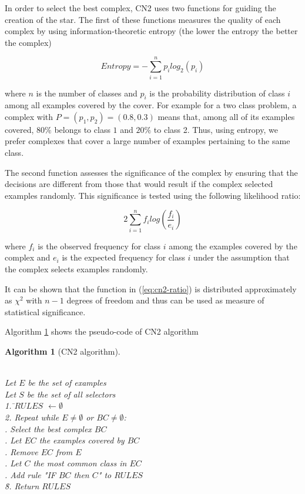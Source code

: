 \documentclass[preprint,3p,twocolumn]{elsarticle}
\newtheorem{algorithm}{Algorithm}[section]
\begin{document}
In order to select the best complex, CN2 uses two functions for guiding the creation of the star. The first of these functions measures the quality of each complex by using information-theoretic entropy (the lower the entropy the better the complex)

\begin{equation} \label{eqn:cn2-entropy}
Entropy = - \sum_{i=1}^{n} p_{i} log_{2}(p_{i})
\end{equation}


where $n$ is the number of classes and $p_{i}$ is the probability distribution of class $i$ among all examples covered by the cover. For example for a two class problem, a complex with $P = (p_{1}, p_{2}) = (0.8, 0.3)$ means that, among all of its examples covered, $80\%$ belongs to class $1$ and $20\%$ to class 2.
Thus, using entropy, we prefer complexes that cover a large number of examples pertaining to the same class.

The second function assesses the significance of the complex by ensuring that the decisions are different from those that would result if the complex selected examples randomly. This significance is tested using the following likelihood ratio:

\begin{equation} \label{eq:cn2-ratio}
2 \sum_{i=1}^{n} f_{i} log \left( \frac{f_{i}}{e_{i}} \right) 
\end{equation}

where $f_{i}$ is the observed frequency for class $i$ among the examples covered by the complex and $e_{i}$ is the expected frequency for class $i$ under the assumption that the complex selects examples randomly.

It can be shown that the function in (\ref{eq:cn2-ratio}) is distributed approximately as $\chi^2$ with $n-1$ degrees of freedom and thus can be used as measure of statistical significance.

Algorithm \ref{algo:CN2} shows the pseudo-code of CN2 algorithm
\begin{algorithm}[CN2 algorithm]
\begin{tabbing}
\\Let $E$ be the set of examples
\\Let $S$ be the set of all selectors\\
1. \=$RULES$ $\leftarrow \emptyset $ \\
2. Repeat while $E \neq \emptyset$ or $BC \neq \emptyset$:\\
 . Select the best complex $BC$\\
 . Let $EC$ the examples covered by $BC$ \\
 . Remove $EC$ from $E$\\
 . Let $C$ the most common class in $EC$\\
 . Add rule "IF $BC$ then $C$" to $RULES$\\
\=8. Return $RULES$
\end{tabbing}
\label{algo:CN2}
\end{algorithm}
\end{document}
